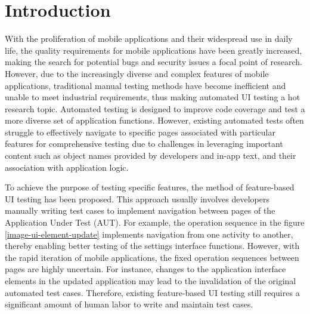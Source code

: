 \documentclass[conference]{IEEEtran}
\begin{document}
\section{Introduction}
With the proliferation of mobile applications and their widespread use in daily life, the quality requirements for mobile applications have been greatly increased, making the search for potential bugs and security issues a focal point of research. However, due to the increasingly diverse and complex features of mobile applications, traditional manual testing methods have become inefficient and unable to meet industrial requirements, thus making automated UI testing a hot research topic. \cite{testingliteraturereview}\cite{androidUIApplicationExerciser}\cite{ngo_automated_2022}\cite{lin_route_2023}\cite{gu_practical_2019} Automated testing is designed to improve code coverage and test a more diverse set of application functions. However, existing automated tests often struggle to effectively navigate to specific pages associated with particular features for comprehensive testing due to challenges in leveraging important content such as object names provided by developers and in-app text, and their association with application logic.

To achieve the purpose of testing specific features, the method of feature-based UI testing has been proposed. This approach usually involves developers manually writing test cases to implement navigation between pages of the Application Under Test (AUT). For example, the operation sequence in the figure \ref{image-ui-element-update} implements navigation from one activity to another, thereby enabling better testing of the settings interface functions.
However, with the rapid iteration of mobile applications, the fixed operation sequences between pages are highly uncertain. For instance, changes to the application interface elements in the updated application may lead to the invalidation of the original automated test cases. Therefore, existing feature-based UI testing still requires a significant amount of human labor to write and maintain test cases.
\end{document}
